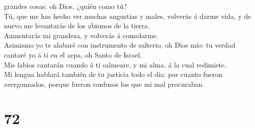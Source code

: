 grandes cosas: oh Dios, ¿quién como tú?\\
 Tú, que me has hecho ver muchas angustias y males,
volverás á darme vida, y de nuevo me levantarás de los abismos de la
tierra.\\
 Aumentarás mi grandeza, y volverás á consolarme.\\
 Asimismo yo te alabaré con instrumento de salterio, oh
Dios mío: tu verdad cantaré yo á ti en el arpa, oh Santo de Israel.\\
 Mis labios cantarán cuando á ti salmeare, y mi alma, á la
cual redimiste.\\
 Mi lengua hablará también de tu justicia todo el día: por
cuanto fueron avergonzados, porque fueron confusos los que mi mal
procuraban.

\hypertarget{section-71}{%
\section{72}\label{section-71}}

